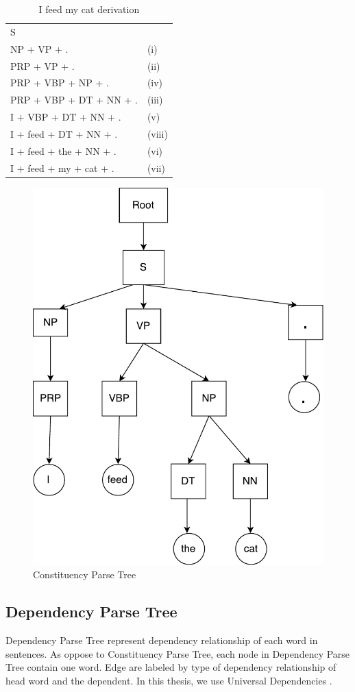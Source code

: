 \begin{table}[H]
	\centering
	\begin{tabular}{ll}
	S	&  \\
	NP + VP + .	& (i) \\
	PRP + VP + .	& (ii) \\
	PRP + VBP + NP + .	& (iv)  \\
	PRP + VBP + DT + NN + .	& (iii) \\
	I + VBP + DT + NN + .	&  (v) \\
	I + feed + DT + NN + .	&  (viii) \\
	I + feed + the + NN + .	&  (vi) \\
	I + feed + my + cat + .	& (vii)
	\end{tabular}
\caption{I feed my cat derivation}
\label{ifeedmycat}
\end{table}

\begin{figure}[H]
	\centering
	\includegraphics[width=0.5\linewidth]{figure/ifeedthecatconstituency}
	\caption[Constituency Parse Tree]{Constituency Parse Tree}
	\label{fig:ifeedthecatconstituency}
\end{figure}

\subsection{Dependency Parse Tree}
Dependency Parse Tree represent dependency relationship of each word in sentences. As oppose to Constituency Parse Tree, each node in Dependency Parse Tree contain one word. Edge are labeled by type of dependency relationship of head word and the dependent. In this thesis, we use Universal Dependencies \cite{nivre2016universal}.

